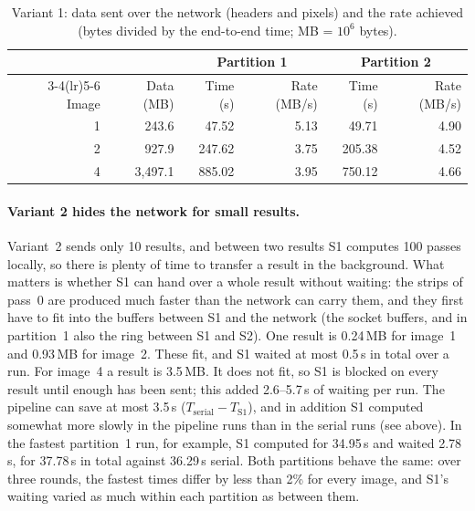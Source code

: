 \documentclass[11pt,a4paper]{article}
\newcommand{\cfgPasses}{100}
\newcommand{\cfgResults}{10}
\begin{document}
\begin{table}[htbp]
\centering
\caption{Variant 1: data sent over the network (headers and pixels) and the rate achieved
(bytes divided by the end-to-end time; MB = $10^6$ bytes).}
\label{tab:part3-rate}
\begin{tabular}{rr rr rr}
\toprule
& & \multicolumn{2}{c}{Partition 1} & \multicolumn{2}{c}{Partition 2} \\
\cmidrule(lr){3-4}\cmidrule(lr){5-6}
Image & Data (MB) & Time (s) & Rate (MB/s) & Time (s) & Rate (MB/s) \\
\midrule
1 & 243.6 & 47.52 & 5.13 & 49.71 & 4.90 \\
2 & 927.9 & 247.62 & 3.75 & 205.38 & 4.52 \\
4 & 3{,}497.1 & 885.02 & 3.95 & 750.12 & 4.66 \\
\bottomrule
\end{tabular}
\end{table}

\paragraph{Variant 2 hides the network for small results.} Variant~2 sends only \cfgResults{}
results, and between two results S1 computes \cfgPasses{} passes locally, so there is plenty of
time to transfer a result in the background. What matters is whether S1 can hand over a whole
result without waiting: the strips of pass~0 are produced much faster than the network can carry
them, and they first have to fit into the buffers between S1 and the network (the socket buffers,
and in partition~1 also the ring between S1 and S2). One result is 0.24\,MB for image~1 and
0.93\,MB for image~2. These fit, and S1 waited at most 0.5\,s in total over a run. For image~4 a
result is 3.5\,MB. It does not fit, so S1 is blocked on every result until enough has been sent;
this added 2.6--5.7\,s of waiting per run. The pipeline can save at most 3.5\,s
($T_\text{serial}-T_\text{S1}$), and in addition S1 computed somewhat more slowly in the pipeline
runs than in the serial runs (see above). In the fastest partition~1 run, for example, S1
computed for 34.95\,s and waited 2.78\,s, for 37.78\,s in total against 36.29\,s serial. Both partitions behave the same: over three rounds, the fastest
times differ by less than 2\% for every image, and S1's waiting varied as much within each
partition as between them.

\end{document}
